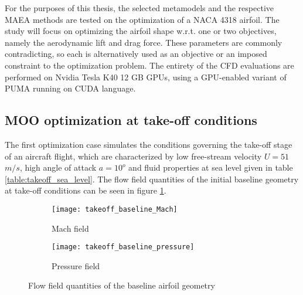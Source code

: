For the purposes of this thesis, the selected metamodels and the 
respective MAEA methods are tested on the optimization of a NACA
4318 airfoil. The study will focus on optimizing the airfoil 
shape w.r.t. one or two objectives, namely the aerodynamic lift and 
drag force. These parameters are commonly contradicting, so each is 
alternatively used as an objective or an imposed constraint to the 
optimization problem. The entirety of the CFD evaluations 
are performed on Nvidia Tesla K40 12 GB GPUs, using a GPU-enabled 
variant of PUMA running on CUDA language.

\vspace{1cm}

\subsection{MOO optimization at take-off conditions}
The first optimization case simulates the conditions governing the 
take-off stage of an aircraft flight, which are characterized by 
low free-stream velocity $U \!= \!51$ $m/s$, high angle of attack 
$a \!= \!10^o$ and fluid properties at sea level given in 
table \ref{table:takeoff_sea_level}. The flow field quantities of 
the initial baseline geometry at take-off conditions can be seen in 
figure \ref{fig:flow_field_takeoff}.

\begin{table}[h!]
\centering
\caption{Air properties at sea level}
\label{table:takeoff_sea_level}
\end{table}  

\vspace{-8mm}

\begin{figure}[h!]
\centering
	\begin{subfigure}[b]{0.49\textwidth}
	\centering
	\caption{Mach field}
	\texttt{[image: takeoff\_baseline\_Mach]} 
	\end{subfigure}
	\hfill
	\begin{subfigure}[b]{0.49\textwidth}
	\centering
	\caption{Pressure field}
	\texttt{[image: takeoff\_baseline\_pressure]}   
	\end{subfigure}
\caption{Flow field quantities of the baseline airfoil geometry}
\label{fig:flow_field_takeoff} 
\end{figure}

